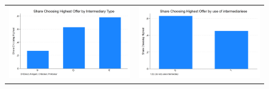 \documentclass[12pt]{article}
\begin{document}
 



   \begin{figure}[H]
\caption{}
 \label{fig:ie4_11}
\centering{}%
\begin{tabular}{cc}
\includegraphics[scale=0.17]{figures/IE4/IE4_highest_by_intermediary_type.png} 
& \includegraphics[scale=0.17]{figures/IE4/IE4_highest_by_intermediary_type(2).png} 
\end{tabular}
\end{figure} 
 


\end{document}
